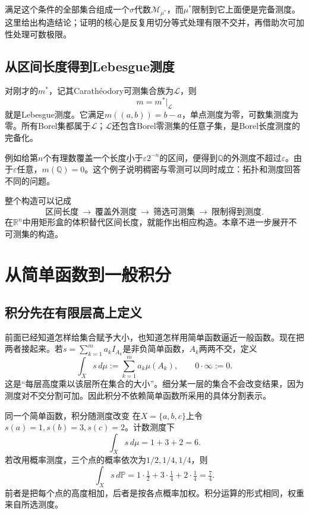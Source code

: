 满足这个条件的全部集合组成一个$\sigma$代数$\mathcal M_{\mu^*}$，而$\mu^*$限制到它上面便是完备测度。这里给出构造结论；证明的核心是反复用切分等式处理有限不交并，再借助次可加性处理可数极限。

\subsection{从区间长度得到Lebesgue测度}

对刚才的$m^*$，记其Carath\'eodory可测集合族为$\mathcal L$，则
\[
 m=m^*|_{\mathcal L}
\]
就是Lebesgue测度。它满足$m((a,b))=b-a$，单点测度为零，可数集测度为零。所有Borel集都属于$\mathcal L$；$\mathcal L$还包含Borel零测集的任意子集，是Borel长度测度的完备化。

例如给第$n$个有理数覆盖一个长度小于$\varepsilon2^{-n}$的区间，便得到$\mathbb Q$的外测度不超过$\varepsilon$。由于$\varepsilon$任意，$m(\mathbb Q)=0$。这个例子说明稠密与零测可以同时成立：拓扑和测度回答不同的问题。

整个构造可以记成
\[
 \text{区间长度}\ \longrightarrow\ \text{覆盖外测度}
 \ \longrightarrow\ \text{筛选可测集}\ \longrightarrow\ \text{限制得到测度}.
\]
在$\mathbb R^n$中用矩形盒的体积替代区间长度，就能作出相应构造。本章不进一步展开不可测集的构造。

\section{从简单函数到一般积分}

\subsection{积分先在有限层高上定义}

前面已经知道怎样给集合赋予大小，也知道怎样用简单函数逼近一般函数。现在把两者接起来。若$s=\sum_{k=1}^m a_kI_{A_k}$是非负简单函数，$A_k$两两不交，定义
\[
 \int_X s\,d\mu:=\sum_{k=1}^m a_k\mu(A_k),
 \qquad 0\cdot\infty:=0.
\]
这是“每层高度乘以该层所在集合的大小”。细分某一层的集合不会改变结果，因为测度对不交分割可加。因此积分不依赖简单函数所采用的具体分割表示。

\begin{bookexample}{同一个简单函数，积分随测度改变}
在$X=\{a,b,c\}$上令$s(a)=1,s(b)=3,s(c)=2$。计数测度下
\[
 \int_X s\,d\mu=1+3+2=6.
\]
若改用概率测度，三个点的概率依次为$1/2,1/4,1/4$，则
\[
 \int_X s\,d\mathbb P=1\cdot\tfrac12+3\cdot\tfrac14+2\cdot\tfrac14
 =\tfrac74.
\]
前者是把每个点的高度相加，后者是按各点概率加权。积分运算的形式相同，权重来自所选测度。
\end{bookexample}


